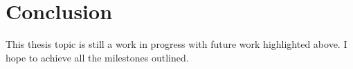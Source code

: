 \chapter{Conclusion}\label{ch:conclusion}

This thesis topic is still a work in progress with future work highlighted above. I hope to achieve all the milestones outlined.